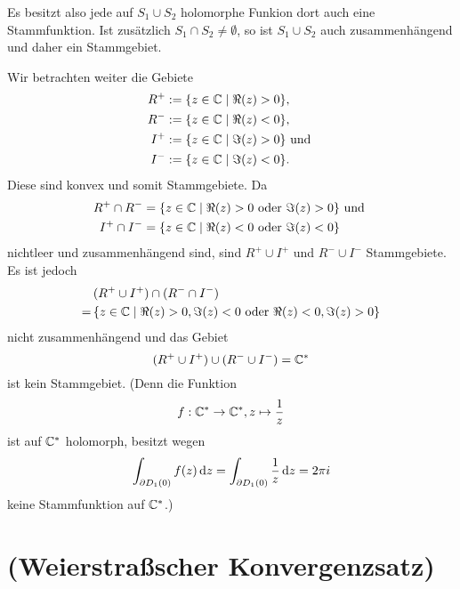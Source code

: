\documentclass[a4paper,10pt]{article}
\begin{document}
Es besitzt also jede auf $S_1 \cup S_2$ holomorphe Funkion dort auch eine Stammfunktion. Ist zusätzlich $S_1 \cap S_2 \neq \emptyset$, so ist $S_1 \cup S_2$ auch zusammenhängend und daher ein Stammgebiet.

Wir betrachten weiter die Gebiete
\begin{align*}
 R^+ &:= \{z \in \mathbb{C} \mid \Re(z) > 0\}, \\
 R^- &:= \{z \in \mathbb{C} \mid \Re(z) < 0\}, \\
 I^+ &:= \{z \in \mathbb{C} \mid \Im(z) > 0\} \text{ und } \\
 I^- &:= \{z \in \mathbb{C} \mid \Im(z) < 0\}.
\end{align*}
Diese sind konvex und somit Stammgebiete. Da
\begin{align*}
 R^+ \cap R^- &= \{z \in \mathbb{C} \mid \Re(z) > 0 \text{ oder } \Im(z) > 0\} \text{ und } \\
 I^+ \cap I^- &= \{z \in \mathbb{C} \mid \Re(z) < 0 \text{ oder } \Im(z) < 0\}
\end{align*}
nichtleer und zusammenhängend sind, sind $R^+ \cup I^+$ und $R^- \cup I^-$ Stammgebiete. Es ist jedoch
\begin{align*}
  &\, (R^+ \cup I^+) \cap (R^- \cap I^-) \\
 =&\,  \{z \in \mathbb{C} \mid \Re(z) > 0, \Im(z) < 0 \text{ oder } \Re(z) < 0, \Im(z) > 0\}
\end{align*}
nicht zusammenhängend und das Gebiet
\[
 (R^+ \cup I^+) \cup (R^- \cup I^-) = \mathbb{C}^*
\]
ist kein Stammgebiet. (Denn die Funktion
\[
 f : \mathbb{C}^* \to \mathbb{C}^*, z \mapsto \frac{1}{z}
\]
ist auf $\mathbb{C}^*$ holomorph, besitzt wegen
\[
 \int_{\partial D_1(0)} f(z) \,\text{d}z
 = \int_{\partial D_1(0)} \frac{1}{z} \,\text{d}z
 = 2 \pi i
\]
keine Stammfunktion auf $\mathbb{C}^*$.)





\section{(Weierstraßscher Konvergenzsatz)}
\end{document}
